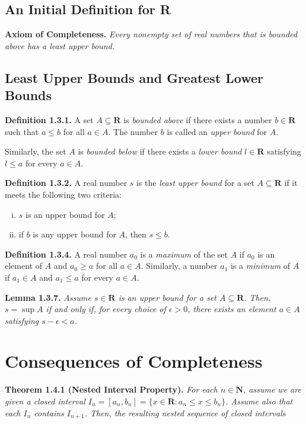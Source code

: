 \documentclass[12pt]{report}
\newcommand{\R}{\textbf{R}}
\newcommand{\N}{\textbf{N}}
\begin{document}
\subsection*{An Initial Definition for R}

\noindent \textbf{Axiom of Completeness.} \textit{Every nonempty set of real numbers that is bounded above has a least upper bound.}
\bigskip

\subsection*{Least Upper Bounds and Greatest Lower Bounds}

\noindent \textbf{Definition 1.3.1.} A set $A\subseteq\R$ is \textit{bounded above} if there exists a number $b\in\R$ such that $a\leq b$ for all $a\in A$. The number $b$ is called an \textit{upper bound} for $A$.

Similarly, the set $A$ is \textit{bounded below} if there exists a \textit{lower bound} $l\in\R$ satisfying $l\leq a$ for every $a\in A$.
\bigskip

\noindent \textbf{Definition 1.3.2.} A real number $s$ is the \textit{least upper bound} for a set $A\subseteq\R$ if it meets the following two criteria:

\begin{enumerate}[(i)]
\item $s$ is an upper bound for $A$;
\item if $b$ is any upper bound for $A$, then $s\leq b$.
\end{enumerate}
\bigskip

\noindent \textbf{Definition 1.3.4.} A real number $a_0$ is a \textit{maximum} of the set $A$ if $a_0$ is an element of $A$ and $a_0\geq a$ for all $a\in A$.  Similarly, a number $a_1$ is a \textit{minimum} of $A$ if $a_1\in A$ and $a_1\leq a$ for every $a\in A$.
\bigskip

\noindent \textbf{Lemma 1.3.7.} \textit{Assume $s\in\R$ is an upper bound for a set $A\subseteq\R$.  Then, $s=\sup A$ if and only if, for every choice of $\epsilon>0$, there exists an element $a\in A$ satisfying $s-\epsilon<a$.}
\bigskip

\section{Consequences of Completeness}

\noindent \textbf{Theorem 1.4.1 (Nested Interval Property).} \textit{For each $n\in\N$, assume we are given a closed interval $I_n=[a_n,b_n]=\{x\in\R:a_n\leq x\leq b_n\}$.  Assume also that each $I_n$ contains $I_{n+1}$.  Then, the resulting nested sequence of closed intervals}
\end{document}
